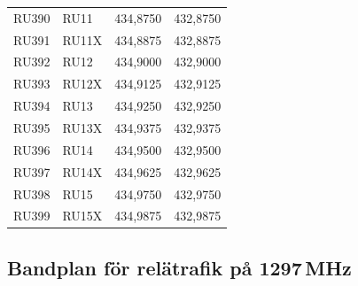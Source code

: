 \begin{tabular}{llrr}
	RU390          & RU11          &        434,8750 &        432,8750 \\
	RU391          & RU11X         &        434,8875 &        432,8875 \\
	RU392          & RU12          &        434,9000 &        432,9000 \\
	RU393          & RU12X         &        434,9125 &        432,9125 \\
	RU394          & RU13          &        434,9250 &        432,9250 \\
	RU395          & RU13X         &        434,9375 &        432,9375 \\
	RU396          & RU14          &        434,9500 &        432,9500 \\
	RU397          & RU14X         &        434,9625 &        432,9625 \\
	RU398          & RU15          &        434,9750 &        432,9750 \\
	RU399          & RU15X         &        434,9875 &        432,9875
\end{tabular}

\subsection{Bandplan för relätrafik på 1297\,MHz}

